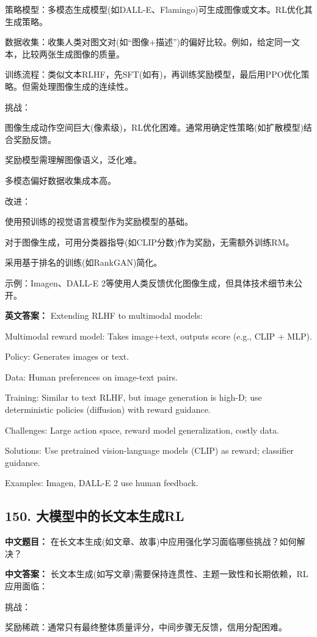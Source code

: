 \documentclass[10pt,a4paper]{ctexart}
\begin{document}
策略模型：多模态生成模型(如DALL-E、Flamingo)可生成图像或文本。RL优化其生成策略。

数据收集：收集人类对图文对(如“图像+描述”)的偏好比较。例如，给定同一文本，比较两张生成图像的质量。

训练流程：类似文本RLHF，先SFT(如有)，再训练奖励模型，最后用PPO优化策略。但需处理图像生成的连续性。

挑战：

图像生成动作空间巨大(像素级)，RL优化困难。通常用确定性策略(如扩散模型)结合奖励反馈。

奖励模型需理解图像语义，泛化难。

多模态偏好数据收集成本高。

改进：

使用预训练的视觉语言模型作为奖励模型的基础。

对于图像生成，可用分类器指导(如CLIP分数)作为奖励，无需额外训练RM。

采用基于排名的训练(如RankGAN)简化。

示例：Imagen、DALL-E 2等使用人类反馈优化图像生成，但具体技术细节未公开。

\textbf{英文答案：}
Extending RLHF to multimodal models:

Multimodal reward model: Takes image+text, outputs score (e.g., CLIP + MLP).

Policy: Generates images or text.

Data: Human preferences on image-text pairs.

Training: Similar to text RLHF, but image generation is high-D; use deterministic policies (diffusion) with reward guidance.

Challenges: Large action space, reward model generalization, costly data.

Solutions: Use pretrained vision-language models (CLIP) as reward; classifier guidance.

Examples: Imagen, DALL-E 2 use human feedback.

\subsection*{150. 大模型中的长文本生成RL}
\textbf{中文题目：} 在长文本生成(如文章、故事)中应用强化学习面临哪些挑战？如何解决？

\textbf{中文答案：}
长文本生成(如写文章)需要保持连贯性、主题一致性和长期依赖，RL应用面临：

挑战：

奖励稀疏：通常只有最终整体质量评分，中间步骤无反馈，信用分配困难。
\end{document}
